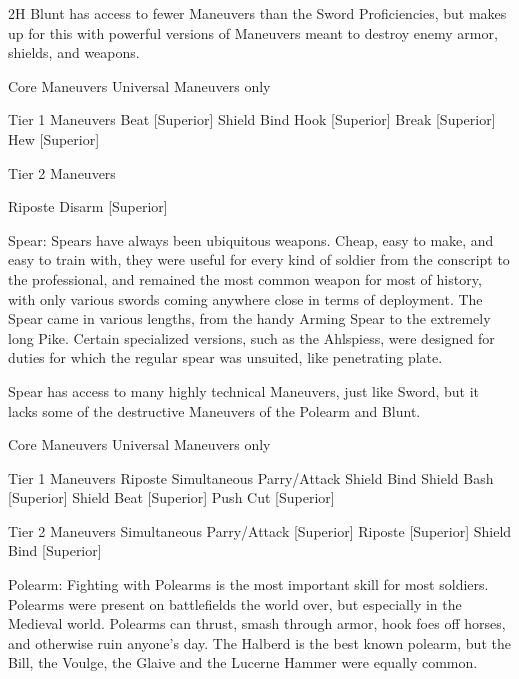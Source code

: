\documentclass[oneside,11pt,english]{book}
\begin{document}
 

2H Blunt has access to fewer Maneuvers than the Sword Proficiencies, but makes up for this with 
powerful versions of Maneuvers meant to destroy enemy armor, shields, and weapons. 

 

Core Maneuvers 
Universal Maneuvers only 

 

Tier 1 Maneuvers 
Beat [Superior] 
Shield Bind 
Hook [Superior] 
Break [Superior] 
Hew [Superior] 

 

Tier 2 Maneuvers 


Riposte 
Disarm [Superior] 

 

Spear: Spears have always been ubiquitous weapons. Cheap, easy to make, and easy to train with, they 
were useful for every kind of soldier from the conscript to the professional, and remained the most 
common weapon for most of history, with only various swords coming anywhere close in terms of 
deployment. The Spear came in various lengths, from the handy Arming Spear to the extremely long Pike. 
Certain specialized versions, such as the Ahlspiess, were designed for duties for which the regular spear 
was unsuited, like penetrating plate. 

 

Spear has access to many highly technical Maneuvers, just like Sword, but it lacks some of the destructive 
Maneuvers of the Polearm and Blunt. 

 

Core Maneuvers 
Universal Maneuvers only 

 

Tier 1 Maneuvers 
Riposte 
Simultaneous Parry/Attack 
Shield Bind 
Shield Bash [Superior] 
Shield Beat [Superior] 
Push Cut [Superior] 

 

 

Tier 2 Maneuvers 
Simultaneous Parry/Attack [Superior] 
Riposte [Superior] 
Shield Bind [Superior] 

 

Polearm: Fighting with Polearms is the most important skill for most soldiers. Polearms were present on 
battlefields the world over, but especially in the Medieval world. Polearms can thrust, smash through 
armor, hook foes off horses, and otherwise ruin anyone’s day. The Halberd is the best known polearm, 
but the Bill, the Voulge, the Glaive and the Lucerne Hammer were equally common. 
\end{document}
